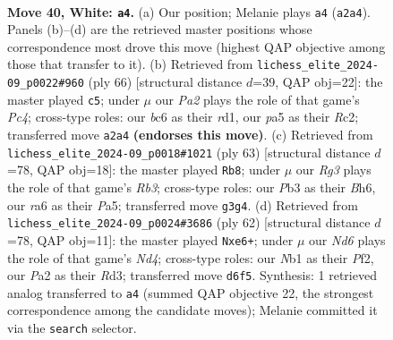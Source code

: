 \documentclass[11pt]{article}
\begin{document}
\clearpage

\begin{figure}[p]\centering
\begin{subfigure}{0.46\textwidth}\centering
\resizebox{\linewidth}{!}{%
\newchessgame
\chessboard[
  setfen={5k2/r4p1p/rnbN2p1/p3p1P1/8/1P2P1RP/P3K1P1/RN6 w - - 1 40},
  showmover=false,
  pgfstyle=straightmove, color=movearrow, markmove={a2-a4}
]}
\caption{}
\end{subfigure}\hfill
\begin{subfigure}{0.46\textwidth}\centering
\resizebox{\linewidth}{!}{%
\newchessgame
\chessboard[
  setfen={3k4/p2r2pp/1p3p2/1P2p3/1bP1N1P1/1P3P2/1RR3PK/3r4 w - - 7 34},
  showmover=false,
  pgfstyle=straightmove, color=movearrow, markmove={c4-c5}
]}
\caption{}
\end{subfigure}
\\[4pt]
\begin{subfigure}{0.46\textwidth}\centering
\resizebox{\linewidth}{!}{%
\newchessgame
\chessboard[
  setfen={8/4kp2/1r1p3b/p1r1p3/1p6/3B1P1P/PPP5/1K1R2R1 b - - 0 32},
  showmover=false,
  pgfstyle=straightmove, color=movearrow, markmove={b6-b8}
]}
\caption{}
\end{subfigure}\hfill
\begin{subfigure}{0.46\textwidth}\centering
\resizebox{\linewidth}{!}{%
\newchessgame
\chessboard[
  setfen={r3rk2/p4p2/1n2b2p/N1R3p1/1P1N4/P2R2P1/5PP1/6K1 w - - 3 32},
  showmover=false,
  pgfstyle=straightmove, color=movearrow, markmove={d4-e6}
]}
\caption{}
\end{subfigure}
\caption{\textbf{Move 40, White: \texttt{a4}.} (a) Our position; Melanie plays \texttt{a4} (\texttt{a2a4}). Panels (b)--(d) are the retrieved master positions whose correspondence most drove this move (highest QAP objective among those that transfer to it). (b) Retrieved from \texttt{lichess\_elite\_2024-09\_p0022\#960} (ply 66) [structural distance $d$=39, QAP obj=22]: the master played \texttt{c5}; under $\mu$ our \emph{Pa2} plays the role of that game's \emph{Pc4}; cross-type roles: our \emph{b}c6 as their \emph{r}d1, our \emph{p}a5 as their \emph{R}c2; transferred move \texttt{a2a4} \textbf{(endorses this move)}. (c) Retrieved from \texttt{lichess\_elite\_2024-09\_p0018\#1021} (ply 63) [structural distance $d$=78, QAP obj=18]: the master played \texttt{Rb8}; under $\mu$ our \emph{Rg3} plays the role of that game's \emph{Rb3}; cross-type roles: our \emph{P}b3 as their \emph{B}h6, our \emph{r}a6 as their \emph{P}a5; transferred move \texttt{g3g4}. (d) Retrieved from \texttt{lichess\_elite\_2024-09\_p0024\#3686} (ply 62) [structural distance $d$=78, QAP obj=11]: the master played \texttt{Nxe6+}; under $\mu$ our \emph{Nd6} plays the role of that game's \emph{Nd4}; cross-type roles: our \emph{N}b1 as their \emph{P}f2, our \emph{P}a2 as their \emph{R}d3; transferred move \texttt{d6f5}. Synthesis: 1 retrieved analog transferred to \texttt{a4} (summed QAP objective 22, the strongest correspondence among the candidate moves); Melanie committed it via the \texttt{search} selector.}
\label{fig:thought-m78}
\end{figure}
\end{document}

